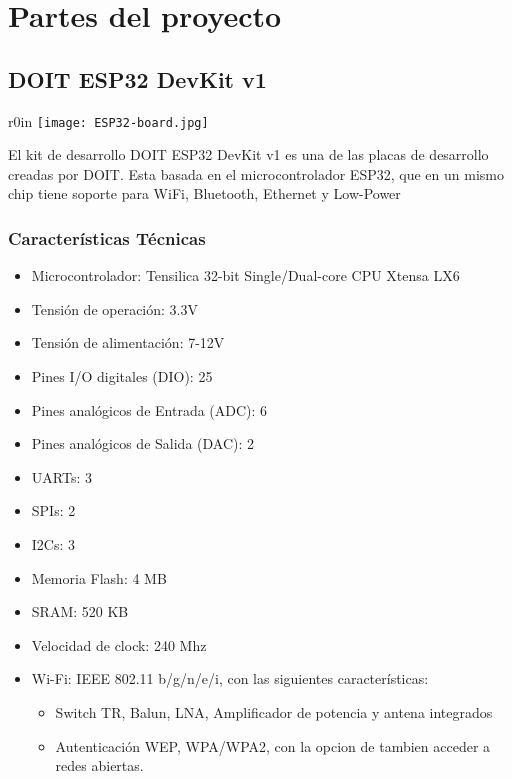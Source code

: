\documentclass[../informe_krapp.tex]{subfiles}
\begin{document}
\section{Partes del proyecto}

\subsection{DOIT ESP32 DevKit v1}
\begin{wrapfigure}{r}{0in}
	\centering
	\texttt{[image: ESP32-board.jpg]}
\end{wrapfigure}
El kit de desarrollo DOIT ESP32 DevKit v1 es una de las placas de desarrollo creadas por
DOIT. Esta basada en el microcontrolador ESP32, que en un mismo chip tiene soporte
para WiFi, Bluetooth, Ethernet y Low-Power

\subsubsection{Características Técnicas}
\begin{itemize}
	\item Microcontrolador: Tensilica 32-bit Single/Dual-core CPU Xtensa LX6
	\item Tensión de operación: 3.3V
	\item Tensión de alimentación: 7-12V
	\item Pines I/O digitales (DIO): 25
	\item Pines analógicos de Entrada (ADC): 6
	\item Pines analógicos de Salida (DAC): 2
	\item UARTs: 3
	\item SPIs: 2
	\item I2Cs: 3
	\item Memoria Flash: 4 MB
	\item SRAM: 520 KB
	\item Velocidad de clock: 240 Mhz
	\item Wi-Fi: IEEE 802.11 b/g/n/e/i, con las siguientes características:
	      \begin{itemize}
		      \item Switch TR, Balun, LNA, Amplificador de potencia y antena integrados
		      \item Autenticación WEP, WPA/WPA2, con la opcion de tambien acceder a redes abiertas.
	      \end{itemize}
\end{itemize}
\end{document}
